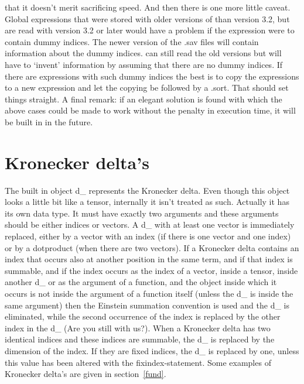 that it doesn't merit sacrificing speed. And then there is one more little 
caveat. Global expressions that were stored with older 
versions of {\FORM} than version 3.2, but are read with version 3.2 or later 
would have a problem if the expression were to contain dummy indices. The 
newer version of the .sav files will contain information 
about the dummy indices. {\FORM} can still read the old versions but will 
have to `invent' information by assuming that there are no dummy indices. 
If there are expressions with such dummy indices the best is to copy the 
expressions to a new expression and let the copying be followed by a .sort. 
That should set things straight. A final remark: if an elegant solution is 
found with which the above cases could be made to work without the penalty 
in execution time, it will be built in in the future.

\section{Kronecker delta's}

\label{sect-kroneckerdelta}
The built in object d\_ represents the Kronecker 
delta. Even though this 
object looks a little bit like a tensor, internally it isn't treated as 
such. Actually it has its own data type. It must have exactly two arguments 
and these arguments should be either indices or vectors. A d\_ with at 
least one vector is immediately replaced, either by a vector with an index 
(if there is one vector and one index) or by a dotproduct (when there are 
two vectors). If a Kronecker delta contains an index that occurs also at 
another position in the same term, and if that index is summable, and if 
the index occurs as the index of a vector, inside a tensor, inside another 
d\_ or as the argument of a function, and the object inside which it occurs 
is not inside the argument of a function itself (unless the d\_ is inside 
the same argument) then the Einstein 
summation convention is used and the 
d\_ is eliminated, while the second occurrence of the index is replaced by 
the other index in the d\_ (Are you still with us?). When a 
Kronecker delta has two identical indices and these indices are summable, 
the d\_ is replaced by the dimension of the index. If they are fixed 
indices, the d\_ is replaced by one, unless this value has been altered 
with the fixindex-statement. Some examples of Kronecker delta's are given 
in section~\ref{fund}.

